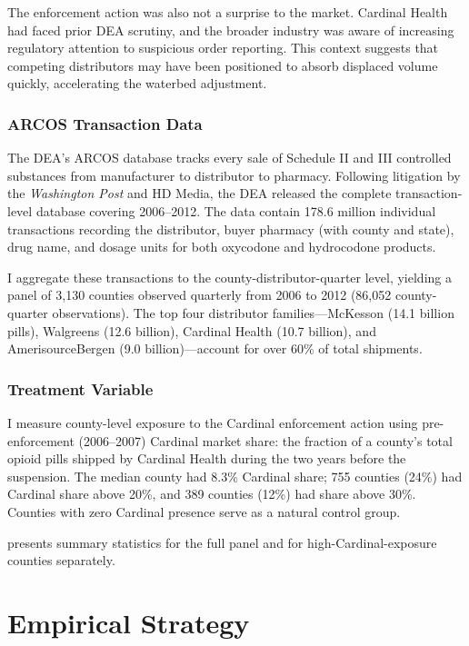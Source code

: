\documentclass[12pt]{article}
\begin{document}
The enforcement action was also not a surprise to the market. Cardinal Health had faced prior DEA scrutiny, and the broader industry was aware of increasing regulatory attention to suspicious order reporting. This context suggests that competing distributors may have been positioned to absorb displaced volume quickly, accelerating the waterbed adjustment.

\subsubsection*{ARCOS Transaction Data}
The DEA's ARCOS database tracks every sale of Schedule II and III controlled substances from manufacturer to distributor to pharmacy. Following litigation by the \textit{Washington Post} and HD Media, the DEA released the complete transaction-level database covering 2006--2012. The data contain 178.6 million individual transactions recording the distributor, buyer pharmacy (with county and state), drug name, and dosage units for both oxycodone and hydrocodone products.

I aggregate these transactions to the county-distributor-quarter level, yielding a panel of 3,130 counties observed quarterly from 2006 to 2012 (86,052 county-quarter observations). The top four distributor families---McKesson (14.1 billion pills), Walgreens (12.6 billion), Cardinal Health (10.7 billion), and AmerisourceBergen (9.0 billion)---account for over 60\% of total shipments.

\subsubsection*{Treatment Variable}
I measure county-level exposure to the Cardinal enforcement action using pre-enforcement (2006--2007) Cardinal market share: the fraction of a county's total opioid pills shipped by Cardinal Health during the two years before the suspension. The median county had 8.3\% Cardinal share; 755 counties (24\%) had Cardinal share above 20\%, and 389 counties (12\%) had share above 30\%. Counties with zero Cardinal presence serve as a natural control group.

 presents summary statistics for the full panel and for high-Cardinal-exposure counties separately.

\section{Empirical Strategy}
\end{document}
